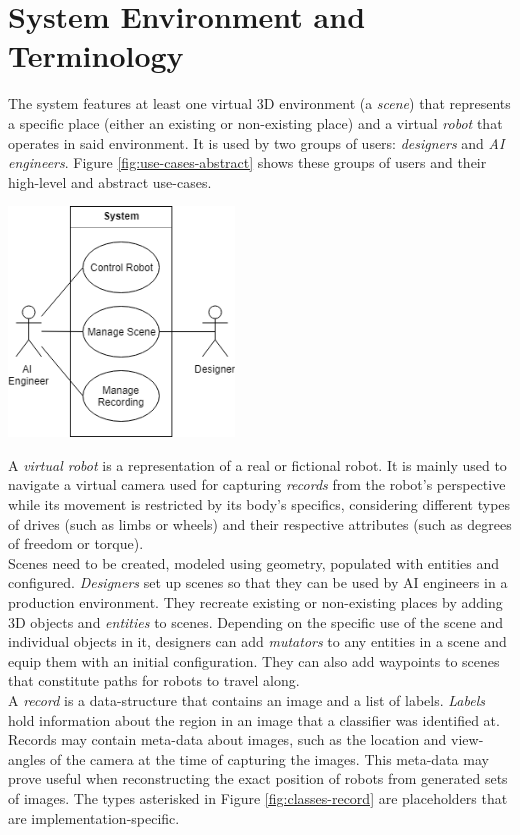 \section{System Environment and Terminology}
The system features at least one virtual 3D environment (a \emph{scene}) that represents a specific place (either an existing or non-existing place) and a virtual \emph{robot} that operates in said environment. It is used by two groups of users: \emph{designers} and \emph{\ac{AI} engineers}. Figure \ref{fig:use-cases-abstract} shows these groups of users and their high-level and abstract use-cases.
\begin{center}
\noindent\includegraphics[width=6cm]{tex/img/ch04/UseCases_HighLevel_01.png}
\label{fig:use-cases-abstract}
\end{center}
A \emph{virtual robot} is a representation of a real or fictional robot. It is mainly used to navigate a virtual camera used for capturing \emph{records} from the robot's perspective while its movement is restricted by its body's specifics, considering different types of drives (such as limbs or wheels) and their respective attributes (such as degrees of freedom or torque).\\
Scenes need to be created, modeled using geometry, populated with entities and configured. \emph{Designers} set up scenes so that they can be used by \acs{AI} engineers in a production environment. They recreate existing or non-existing places by adding 3D objects and \emph{entities} to scenes. Depending on the specific use of the scene and individual objects in it, designers can add \emph{mutators} to any entities in a scene and equip them with an initial configuration. They can also add waypoints to scenes that constitute paths for robots to travel along.\\
A \emph{record} is a data-structure that contains an image and a list of labels. \emph{Labels} hold information about the region in an image that a classifier was identified at. Records may contain meta-data about images, such as the location and view-angles of the camera at the time of capturing the images. This meta-data may prove useful when reconstructing the exact position of robots from generated sets of images. The types asterisked in Figure \ref{fig:classes-record} are placeholders that are implementation-specific.
